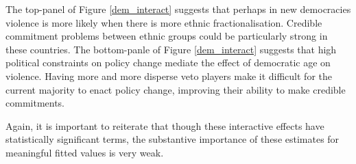 \documentclass[a4paper]{article}\usepackage[]{graphicx}\usepackage[]{color}
\begin{document}
The top-panel of Figure \ref{dem_interact} suggests that perhaps in new democracies violence is more likely when there is more ethnic fractionalisation. Credible commitment problems between ethnic groups could be particularly strong in these countries. The bottom-panle of Figure \ref{dem_interact} suggests that high political constraints on policy change mediate the effect of democratic age on violence. Having more and more disperse veto players make it difficult for the current majority to enact policy change, improving their ability to make credible commitments.

Again, it is important to reiterate that though these interactive effects have statistically significant terms, the substantive importance of these estimates for meaningful fitted values is very weak.
\end{document}

